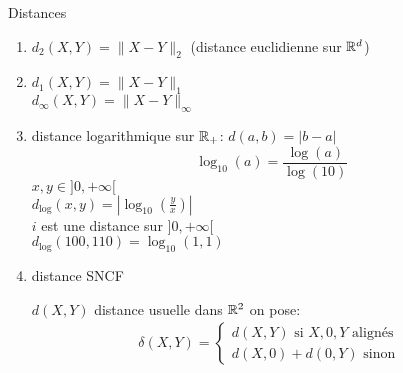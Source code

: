 \begin{eg} Distances
   \begin{enumerate}
       \item $d_2(X, Y) = \|X - Y\|_2$ (distance euclidienne sur $\mathbb{R}^d$)
       \item $d_1(X, Y) = \|X - Y\|_1$\\
           $d_{\infty}(X, Y) = \|X - Y\|_{\infty}$
       \item distance logarithmique sur $\mathbb{R}_+$:  $d(a, b) = |b - a|$
           \[
               \log_{10}(a) = \frac{\log(a)}{\log(10)}
           \] 
           $x, y \in ]0, +\infty[$\\ 
           $d_{\log}(x, y) = |\log_{10}(\frac{y}{x})|$ \\
           $i$ est une distance sur  $]0, +\infty[$\\
           $d_{\log}(100, 110) = \log_{10}(1,1)$
       \item distance SNCF
           \begin{center}
               
           \end{center}
           $d(X, Y)$ distance usuelle dans  $\mathbb{R}^2$
           on pose:
            \begin{align*}
               \delta(X, Y) = \begin{cases}
                   d(X, Y) \text{ si } X, 0, Y \text{ alignés}\\
                   d(X, 0) + d(0, Y) \text{ sinon }
               \end{cases}
           \end{align*}
   \end{enumerate}
\end{eg}
